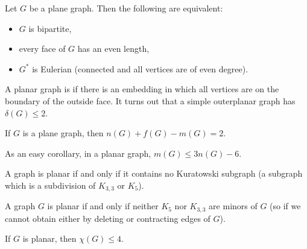 \begin{theorem}
  Let $G$ be a plane graph.
  Then the following are equivalent:
  \begin{itemize}
  \item $G$ is bipartite,
  \item every face of $G$ has an even length,
  \item $G^*$ is Eulerian (connected and all vertices are of even degree).
  \end{itemize}
\end{theorem}

A planar graph is  if there is an embedding in which all
vertices are on the boundary of the outside face.
It turns out that a simple outerplanar graph has $\delta(G) \le 2$.

\begin{theorem}[Euler]
  If $G$ is a plane graph, then $n(G) + f(G) - m(G) = 2$.
\end{theorem}

As an easy corollary, in a planar graph, $m(G) \le 3n(G) - 6$.

\begin{theorem}[Kuratowski]
  A graph is planar if and only if it contains no Kuratowski subgraph (a
  subgraph which is a subdivision of $K_{3,3}$ or $K_5$).
\end{theorem}

\begin{theorem}[Wagner]
  A graph $G$ is planar if and only if neither $K_5$ nor $K_{3,3}$ are minors of
  $G$ (so if we cannot obtain either by deleting or contracting edges of $G$).
\end{theorem}

\begin{theorem}
  If $G$ is planar, then $\chi(G) \le 4$.
\end{theorem}

